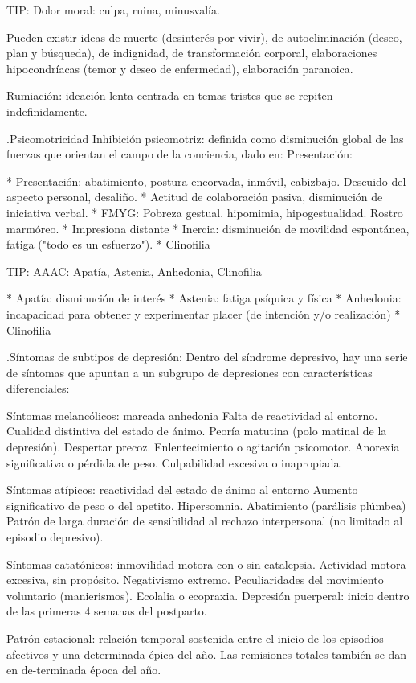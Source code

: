 \documentclass{scrbook}
\begin{document}
TIP: Dolor moral: culpa, ruina, minusvalía.

Pueden existir ideas de muerte (desinterés por vivir), de autoeliminación (deseo, plan y búsqueda), de indignidad, de transformación corporal, elaboraciones hipocondríacas (temor y deseo de enfermedad), elaboración paranoica.

Rumiación: ideación lenta centrada en temas tristes que se repiten indefinidamente.

.Psicomotricidad
Inhibición psicomotriz: definida como disminución global de las fuerzas que orientan el campo de la conciencia, dado en: Presentación:

* Presentación: abatimiento, postura encorvada, inmóvil, cabizbajo. Descuido del aspecto personal, desaliño.
* Actitud de colaboración pasiva, disminución de iniciativa verbal.
* FMYG: Pobreza gestual. hipomimia, hipogestualidad. Rostro marmóreo.
* Impresiona distante
* Inercia: disminución de movilidad espontánea, fatiga ("todo es un esfuerzo").
* Clinofilia

TIP: AAAC: Apatía, Astenia, Anhedonia, Clinofilia

* Apatía: disminución de interés
* Astenia: fatiga psíquica y física
* Anhedonia: incapacidad para obtener y experimentar placer (de intención y/o realización)
* Clinofilia

.Síntomas de subtipos de depresión:
Dentro del síndrome depresivo, hay una serie de síntomas que apuntan a un subgrupo de depresiones con características diferenciales:

Síntomas melancólicos: marcada anhedonia Falta de reactividad al entorno. Cualidad distintiva del estado de ánimo. Peoría matutina (polo matinal de la depresión). Despertar precoz. Enlentecimiento o agitación psicomotor. Anorexia significativa o pérdida de peso. Culpabilidad excesiva o inapropiada.

Síntomas atípicos: reactividad del estado de ánimo al entorno Aumento significativo de peso o del apetito. Hipersomnia. Abatimiento (parálisis plúmbea) Patrón de larga duración de sensibilidad al rechazo interpersonal (no limitado al episodio depresivo).

Síntomas catatónicos: inmovilidad motora con o sin catalepsia. Actividad motora excesiva, sin propósito. Negativismo extremo. Peculiaridades del movimiento voluntario (manierismos). Ecolalia o ecopraxia. Depresión puerperal: inicio dentro de las primeras 4 semanas del postparto.

Patrón estacional: relación temporal sostenida entre el inicio de los episodios afectivos y una determinada épica del año. Las remisiones totales también se dan en de-terminada época del año.
\end{document}
